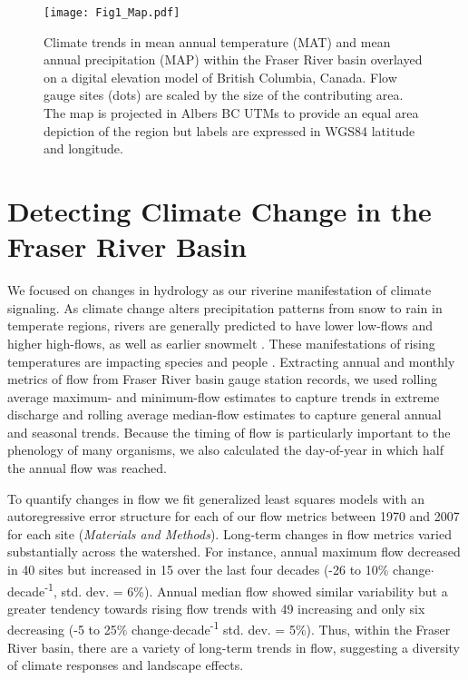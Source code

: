 \documentclass[9pt,twocolumn,twoside,lineno]{pnas-new}
\begin{document}
\begin{figure}[h]
\centering
\texttt{[image: Fig1\_Map.pdf]}
	\caption{Climate trends in mean annual temperature (MAT) and mean annual precipitation (MAP) within the Fraser River basin overlayed on a digital elevation model of British Columbia, Canada. Flow gauge sites (dots) are scaled by the size of the contributing area. The map is projected in Albers BC UTMs to provide an equal area depiction of the region but labels are expressed in WGS84 latitude and longitude.}
\label{fig:1}
\end{figure}

\section*{Detecting Climate Change in the Fraser River Basin}
We focused on changes in hydrology as our riverine manifestation of climate signaling. As climate change alters precipitation patterns from snow to rain in temperate regions, rivers are generally predicted to have lower low-flows and higher high-flows, as well as earlier snowmelt \citep{Nijssen:2001}. These manifestations of rising temperatures are impacting species \citep{Xenopoulos:2006} and people \citep{Hirabayashi:2013}. Extracting annual and monthly metrics of flow from Fraser River basin gauge station records, we used rolling average maximum- and minimum-flow estimates to capture trends in extreme discharge and rolling average median-flow estimates to capture general annual and seasonal trends. Because the timing of flow is particularly important to the phenology of many organisms, we also calculated the day-of-year in which half the annual flow was reached. 

To quantify changes in flow we fit generalized least squares models with an autoregressive error structure for each of our flow metrics between 1970 and 2007 for each site (\textit{Materials and Methods}). Long-term changes in flow metrics varied substantially across the watershed. For instance, annual maximum flow decreased in 40 sites but increased in 15 over the last four decades (-26 to 10\% change$\cdot$decade\textsuperscript{-1}, std. dev. = 6\%). Annual median flow showed similar variability but a greater tendency towards rising flow trends with 49 increasing and only six decreasing (-5 to 25\% change$\cdot$decade\textsuperscript{-1} std. dev. = 5\%). Thus, within the Fraser River basin, there are a variety of long-term trends in flow, suggesting a diversity of climate responses and landscape effects.
\end{document}

